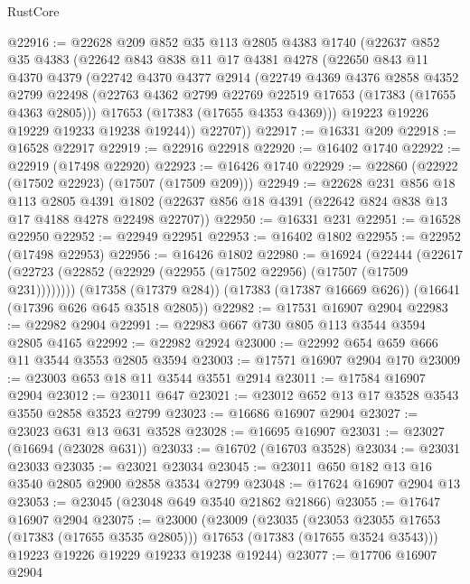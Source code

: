 \begin{lexlean}{RustCore}
\begin{coremodule}
@22916 := @22628
    @209
    @852
    @35
    @113
    @2805
    @4383
    @1740
    (@22637
      @852
      @35
      @4383
      (@22642
        @843
        @838
        @11
        @17
        @4381
        @4278
        (@22650
          @843
          @11
          @4370
          @4379
          (@22742
            @4370
            @4377
            @2914
            (@22749
              @4369
              @4376
              @2858
              @4352
              @2799
              @22498
              (@22763 @4362 @2799 @22769 @22519 @17653 (@17383 (@17655 @4363 @2805)))
              @17653
              (@17383 (@17655 @4353 @4369)))
            @19223
            @19226
            @19229
            @19233
            @19238
            @19244))
        @22707))
@22917 := @16331 @209
@22918 := @16528 @22917
@22919 := @22916 @22918
@22920 := @16402 @1740
@22922 := @22919 (@17498 @22920)
@22923 := @16426 @1740
@22929 := @22860 (@22922 (@17502 @22923) (@17507 (@17509 @209)))
@22949 := @22628
    @231
    @856
    @18
    @113
    @2805
    @4391
    @1802
    (@22637 @856 @18 @4391 (@22642 @824 @838 @13 @17 @4188 @4278 @22498 @22707))
@22950 := @16331 @231
@22951 := @16528 @22950
@22952 := @22949 @22951
@22953 := @16402 @1802
@22955 := @22952 (@17498 @22953)
@22956 := @16426 @1802
@22980 := @16924
    (@22444 (@22617 (@22723 (@22852 (@22929 (@22955 (@17502 @22956) (@17507 (@17509 @231))))))))
    (@17358 (@17379 @284))
    (@17383 (@17387 @16669 @626))
    (@16641 (@17396 @626 @645 @3518 @2805))
@22982 := @17531 @16907 @2904
@22983 := @22982 @2904
@22991 := @22983 @667 @730 @805 @113 @3544 @3594 @2805 @4165
@22992 := @22982 @2924
@23000 := @22992 @654 @659 @666 @11 @3544 @3553 @2805 @3594
@23003 := @17571 @16907 @2904 @170
@23009 := @23003 @653 @18 @11 @3544 @3551 @2914
@23011 := @17584 @16907 @2904
@23012 := @23011 @647
@23021 := @23012 @652 @13 @17 @3528 @3543 @3550 @2858 @3523 @2799
@23023 := @16686 @16907 @2904
@23027 := @23023 @631 @13 @631 @3528
@23028 := @16695 @16907
@23031 := @23027 (@16694 (@23028 @631))
@23033 := @16702 (@16703 @3528)
@23034 := @23031 @23033
@23035 := @23021 @23034
@23045 := @23011 @650 @182 @13 @16 @3540 @2805 @2900 @2858 @3534 @2799
@23048 := @17624 @16907 @2904 @13
@23053 := @23045 (@23048 @649 @3540 @21862 @21866)
@23055 := @17647 @16907 @2904
@23075 := @23000
    (@23009
      (@23035
        (@23053 @23055 @17653 (@17383 (@17655 @3535 @2805)))
        @17653
        (@17383 (@17655 @3524 @3543)))
      @19223
      @19226
      @19229
      @19233
      @19238
      @19244)
@23077 := @17706 @16907 @2904

\end{coremodule}
\end{lexlean}
